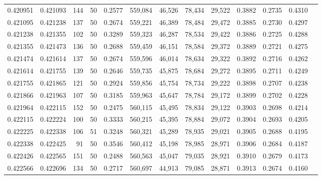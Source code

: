\begin{tabular}{rrrrrrrrrrrrr}
0.420951 & 0.421093 &   144 &  50 &                                     0.2577 & 559,084 &  46,526 &  78,434 &  29,522 & 0.3882 & 0.2735 & 0.4310 \\
0.421095 & 0.421238 &   137 &  50 &                                     0.2674 & 559,221 &  46,389 &  78,484 &  29,472 & 0.3885 & 0.2730 & 0.4297 \\
0.421238 & 0.421355 &   102 &  50 &                                     0.3289 & 559,323 &  46,287 &  78,534 &  29,422 & 0.3886 & 0.2725 & 0.4288 \\
0.421355 & 0.421473 &   136 &  50 &                                     0.2688 & 559,459 &  46,151 &  78,584 &  29,372 & 0.3889 & 0.2721 & 0.4275 \\
0.421474 & 0.421614 &   137 &  50 &                                     0.2674 & 559,596 &  46,014 &  78,634 &  29,322 & 0.3892 & 0.2716 & 0.4262 \\
0.421614 & 0.421755 &   139 &  50 &                                     0.2646 & 559,735 &  45,875 &  78,684 &  29,272 & 0.3895 & 0.2711 & 0.4249 \\
0.421755 & 0.421865 &   121 &  50 &                                     0.2924 & 559,856 &  45,754 &  78,734 &  29,222 & 0.3898 & 0.2707 & 0.4238 \\
0.421866 & 0.421963 &   107 &  50 &                                     0.3185 & 559,963 &  45,647 &  78,784 &  29,172 & 0.3899 & 0.2702 & 0.4228 \\
0.421964 & 0.422115 &   152 &  50 &                                     0.2475 & 560,115 &  45,495 &  78,834 &  29,122 & 0.3903 & 0.2698 & 0.4214 \\
0.422115 & 0.422224 &   100 &  50 &                                     0.3333 & 560,215 &  45,395 &  78,884 &  29,072 & 0.3904 & 0.2693 & 0.4205 \\
0.422225 & 0.422338 &   106 &  51 &                                     0.3248 & 560,321 &  45,289 &  78,935 &  29,021 & 0.3905 & 0.2688 & 0.4195 \\
0.422338 & 0.422425 &    91 &  50 &                                     0.3546 & 560,412 &  45,198 &  78,985 &  28,971 & 0.3906 & 0.2684 & 0.4187 \\
0.422426 & 0.422565 &   151 &  50 &                                     0.2488 & 560,563 &  45,047 &  79,035 &  28,921 & 0.3910 & 0.2679 & 0.4173 \\
0.422566 & 0.422696 &   134 &  50 &                                     0.2717 & 560,697 &  44,913 &  79,085 &  28,871 & 0.3913 & 0.2674 & 0.4160 \\

\end{tabular}
